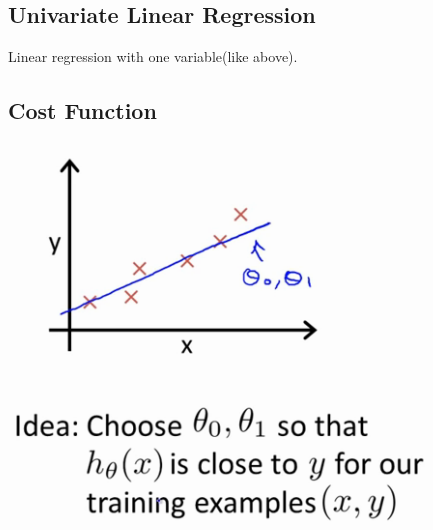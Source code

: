 \documentclass[12pt]{article}
\begin{document}
\subsection* {Univariate Linear Regression}

    Linear regression with one variable(like above).

\subsection* {Cost Function}
    \begin{center}
    \includegraphics[scale=0.5]{ChooseTheta.png}
    \end{center}
\end{document}
